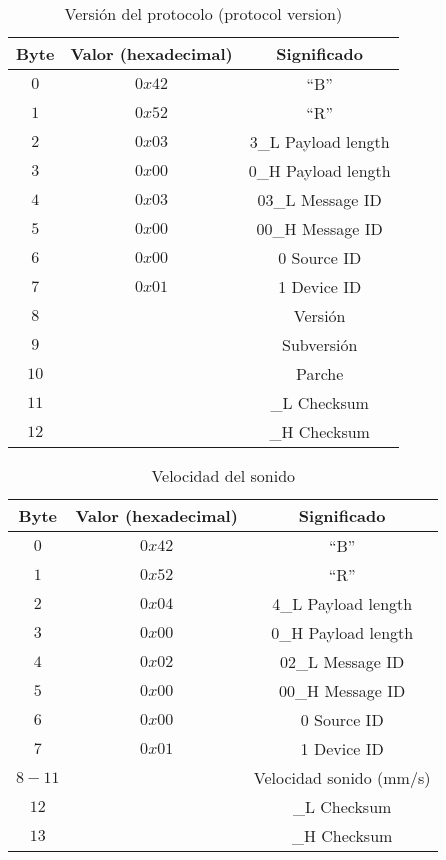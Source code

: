 \begin{table}[h]
	\centering
	\caption{Versión del protocolo (protocol version)}
	\begin{tabular}{|c|c|c|}
		\hline
		\textbf{Byte}	&\textbf{Valor (hexadecimal)} &\textbf{Significado} \\ \hline  \hline
		$0$		&$0x42$		& ``B'' \\ \hline
		$1$		&$0x52$		& ``R'' \\ \hline
		$2$		&$0x03$		& 3\_L Payload length \\ \hline
		$3$		&$0x00$		& 0\_H Payload length \\ \hline
		$4$		&$0x03$		& 03\_L Message ID \\ \hline
		$5$		&$0x00$		& 00\_H Message ID \\ \hline
		$6$		&$0x00$		& 0    Source ID \\ \hline 
		$7$		&$0x01$		& 1    Device ID \\ \hline
		$8$		&			& Versión \\ \hline
		$9$		&			& Subversión \\ \hline  
		$10$		&			& Parche \\ \hline  
		$11$	&			& \_L Checksum\\ \hline   
		$12$	&			& \_H Checksum\\ \hline  
	\end{tabular}
	\label{tab:9}
\end{table}


\begin{table}[h]
	\centering
	\caption{Velocidad del sonido}
	\begin{tabular}{|c|c|c|}
		\hline
		\textbf{Byte}	&\textbf{Valor (hexadecimal)} &\textbf{Significado} \\ \hline  \hline
		$0$		&$0x42$		& ``B'' \\ \hline
		$1$		&$0x52$		& ``R'' \\ \hline
		$2$		&$0x04$		& 4\_L Payload length \\ \hline
		$3$		&$0x00$		& 0\_H Payload length \\ \hline
		$4$		&$0x02$		& 02\_L Message ID \\ \hline
		$5$		&$0x00$		& 00\_H Message ID \\ \hline
		$6$		&$0x00$		& 0    Source ID \\ \hline 
		$7$		&$0x01$		& 1    Device ID \\ \hline
		$8-11$	&			& Velocidad sonido (mm/s) \\ \hline
		$12$	&			& \_L Checksum\\ \hline   
		$13$	&			& \_H Checksum\\ \hline  
	\end{tabular}
	\label{tab:10}
\end{table}


